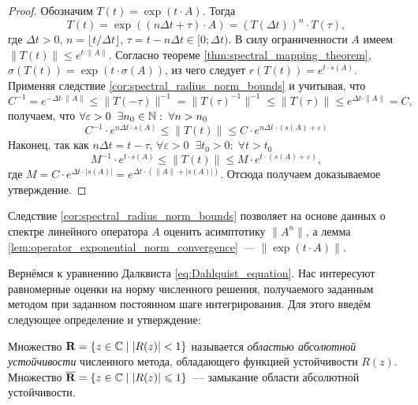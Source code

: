 \begin{proof}
    Обозначим $ T(t) = \exp(t \cdot A) $.
    Тогда
    \[
        T(t) = \exp((n \Delta t + \tau) \cdot A) = \left( T(\Delta t) \right)^n \cdot T(\tau),
    \]
    где $ \Delta t > 0 $, $ n = \lfloor t / \Delta t \rfloor $, $ \tau = t - n \Delta t \in [0;\Delta t) $.
    В силу ограниченности $ A $ имеем $ \| T(t) \| \leqslant e^{t \cdot \| A \|} $.
    Согласно теореме \ref{thm:spectral_mapping_theorem}, $ \sigma(T(t)) = \exp(t \cdot \sigma(A)) $, из чего следует $ r(T(t)) = e^{t \cdot s(A)} $.
    Применяя следствие \ref{cor:spectral_radius_norm_bounds} и учитывая, что
    \[
        C^{-1} = e^{-\Delta t \cdot \| A \|} \leqslant \| T(-\tau) \|^{-1} = \| T(\tau)^{-1} \|^{-1} \leqslant \| T(\tau) \| \leqslant e^{\Delta t \cdot \| A \|} = C,
    \]
    получаем, что $ \forall \varepsilon > 0 \;\; \exists n_0 \in \mathbb{N}: \; \forall n > n_0 $
    \[
        C^{-1} \cdot e^{n \Delta t \cdot s(A)} \leqslant \| T(t) \| \leqslant C \cdot e^{n \Delta t \cdot (s(A) + \varepsilon)}
    \]
    Наконец, так как $ n \Delta t = t - \tau $, $ \forall \varepsilon > 0 \;\; \exists t_0 > 0: \; \forall t > t_0 $
    \[
        M^{-1} \cdot e^{t \cdot s(A)} \leqslant \| T(t) \| \leqslant M \cdot e^{t \cdot (s(A) + \varepsilon)},
    \]
    где $ M = C \cdot e^{\Delta t \cdot |s(A)|} = e^{\Delta t \cdot (\|A\| + |s(A)|)} $. %
    Отсюда получаем доказываемое утверждение.
\end{proof}

Следствие \ref{cor:spectral_radius_norm_bounds} позволяет на основе данных о спектре линейного оператора $ A $ оценить асимптотику $ \| A^n \| $,
а лемма \ref{lem:operator_exponential_norm_convergence}~--- $ \| \exp(t \cdot A) \| $.

Вернёмся к уравнению Далквиста \eqref{eq:Dahlquist_equation}.
Нас интересуют равномерные оценки на норму численного решения, получаемого заданным методом при заданном постоянном шаге интегрирования.
Для этого введём следующее определение и утверждение:

\begin{definition}
    \label{def:stability_region}
    Множество $ \mathbf{R} = \{ z \in \mathbb{C} \mid | R(z) | < 1 \} $ называется \emph{областью абсолютной устойчивости} численного метода, обладающего функцией устойчивости $ R(z) $.
    Множество $ \overline{\mathbf{R}} = \{ z \in \mathbb{C} \mid | R(z) | \leqslant 1 \} $~--- замыкание области абсолютной устойчивости.
\end{definition}


